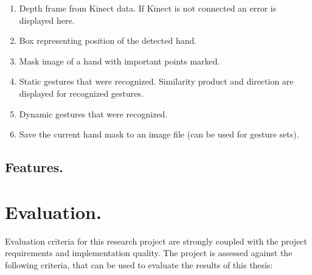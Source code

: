 \documentclass[a4paper,11pt,oneside]{article}
\begin{document}
\begin{enumerate}
\item Depth frame from Kinect data. If Kinect is not connected an error is displayed here.
\item Box representing position of the detected hand.
\item Mask image of a hand with important points marked.
\item Static gestures that were recognized. Similarity product and direction are displayed for recognized gestures.
\item Dynamic gestures that were recognized.
\item Save the current hand mask to an image file (can be used for gesture sets).
\end{enumerate}

\subsection{Features.}

 
 \section{Evaluation.}
  
 Evaluation criteria for this research project are strongly coupled with the project requirements and implementation quality. The project is assessed against the following criteria, that can be used to evaluate the results of this thesis:
\end{document}
